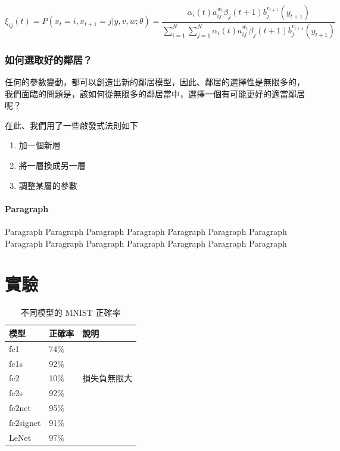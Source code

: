 \documentclass{article}
\begin{document}
\begin{equation}
\xi _{ij}(t)=P(x_{t}=i,x_{t+1}=j|y,v,w;\theta)= {\frac {\alpha _{i}(t)a^{w_t}_{ij}\beta _{j}(t+1)b^{v_{t+1}}_{j}(y_{t+1})}{\sum _{i=1}^{N} \sum _{j=1}^{N} \alpha _{i}(t)a^{w_t}_{ij}\beta _{j}(t+1)b^{v_{t+1}}_{j}(y_{t+1})}}
\end{equation}

\subsubsection{如何選取好的鄰居？}

任何的參數變動，都可以創造出新的鄰居模型，因此、鄰居的選擇性是無限多的，我們面臨的問題是，該如何從無限多的鄰居當中，選擇一個有可能更好的適當鄰居呢？

在此、我們用了一些啟發式法則如下

\begin{enumerate}  
\item 加一個新層 
\item 將一層換成另一層
\item 調整某層的參數
\end{enumerate}

\paragraph{Paragraph}

Paragraph Paragraph Paragraph Paragraph Paragraph Paragraph Paragraph Paragraph Paragraph Paragraph Paragraph Paragraph Paragraph Paragraph 

\section{實驗}
\label{sec:others}

\begin{table}
 \caption{不同模型的 MNIST 正確率}
  \centering
  \begin{tabular}{lll}
    模型     & 正確率     & 說明 \\
    \midrule
    fc1 & 74\% &       \\
    fc1s & 92\% &       \\
    fc2 & 10\% & 損失負無限大 \\
    fc2s & 92\% &       \\
    fc2net & 95\% &       \\
    fc2signet & 91\% &       \\
    LeNet & 97\%  &      \\
    \bottomrule
  \end{tabular}
  \label{tab:table}
\end{table}
\end{document}
